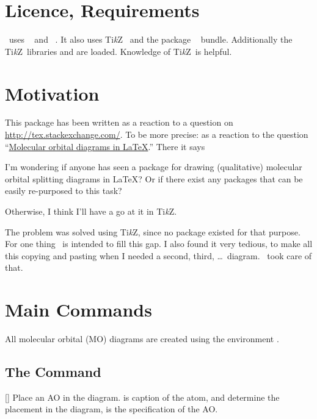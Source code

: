 \documentclass[load-preamble+]{cnltx-doc}
\newcommand*\TikZ{Ti\textit{k}Z}
\begin{document}
\section{Licence, Requirements}
\license

\modiagram\ uses ~\cite{bnd:l3kernel} and
~\cite{bnd:l3packages}. It also uses \TikZ~\cite{pkg:pgf} and
the package ~\cite{pkg:chemgreek} bundle.  Additionally the
\TikZ\ libraries  and  are loaded.  Knowledge of
\TikZ\ is helpful.

\section{Motivation}
This package has been written as a reaction to a question on
\url{http://tex.stackexchange.com/}. To be more precise: as a reaction to the
question
``\href{http://tex.stackexchange.com/questions/13863/molecular-orbital-diagrams-in-latex}%
{Molecular orbital diagrams in LaTeX}.'' There it says
\begin{cnltxquote}
  I'm wondering if anyone has seen a package for drawing (qualitative)
  molecular orbital splitting diagrams in \LaTeX? Or if there exist any
  packages that can be easily re-purposed to this task?

  Otherwise, I think I'll have a go at it in \TikZ.
\end{cnltxquote}
The problem was solved using \TikZ, since no package existed for that purpose.
For one thing \modiagram\ is intended to fill this gap. I also found it very
tedious, to make all this copying and pasting when I needed a second, third,
\ldots\ diagram. \modiagram\ took care of that.


\section{Main Commands}
All molecular orbital (MO) diagrams are created using the environment
.

\subsection{The  Command}
\begin{commands}
  []
    Place an \acs{AO} in the diagram.  is caption of the atom,
     and  determine the placement in the diagram,
     is the specification of the \ac{AO}.
\end{commands}
\end{document}
